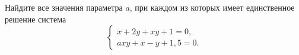 \begin{ex}
	\begin{condition}
		Найдите все значения параметра \( a \), при каждом из которых имеет единственное решение система
		\[ \left\{
		\begin{array}{l}
			x+2y+xy+1=0,\\
			axy+x-y+1,5=0.
		\end{array}
		\right. \]
	\end{condition}
\end{ex}